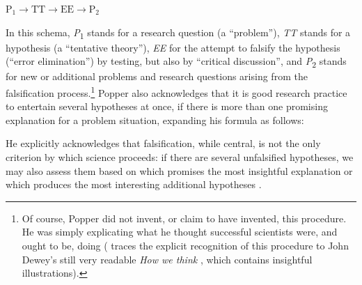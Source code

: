 \begin{exe}
\ex $\text{P}_{1} \rightarrow \text{TT} \rightarrow \text{EE} \rightarrow \text{P}_{2}$
\label{ex:popperscience}
\end{exe}

In this schema, \textit{P}\textsubscript{1} stands for a research question (a ``problem''), \textit{TT} stands for a hypothesis  (a ``tentative theory''), \textit{EE} for the attempt to falsify  the hypothesis (``error elimination'') by testing, but also by ``critical discussion'', and \textit{P}\textsubscript{2} stands for new or additional problems and research questions arising from the falsification process.\footnote{Of course, Popper did not invent, or claim to have invented, this procedure. He was simply explicating what he thought successful scientists were, and ought to be, doing (\citet{rudolph_epistemology_2005} traces the explicit recognition of this procedure to John Dewey's still very readable \textit{How we think} \citep{dewey_how_1910}, which contains insightful illustrations).} Popper also acknowledges that it is good research practice to entertain several hypotheses at once, if there is more than one promising explanation  for a problem situation, expanding his formula as follows:

\begin{exe}
\ex\label{ex:poppersciences}
\end{exe}

He explicitly acknowledges that falsification,  while central, is not the only criterion by which science proceeds: if there are several unfalsified hypotheses,  we may also assess them based on which promises the most insightful explanation  or which produces the most interesting additional hypotheses \citep[3]{yourgrau_realist_1970}.

